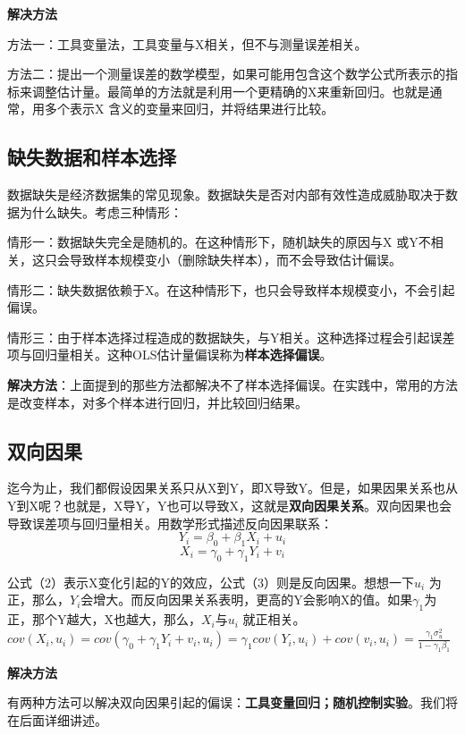 \documentclass[cn,12pt,math=newtx,citestyle=gb7714-2015,bibstyle=gb7714-2015]{elegantbook}
\begin{document}
\textbf{解决方法}

方法一：工具变量法，工具变量与X相关，但不与测量误差相关。

方法二：提出一个测量误差的数学模型，如果可能用包含这个数学公式所表示的指标来调整估计量。最简单的方法就是利用一个更精确的X来重新回归。也就是通常，用多个表示X 含义的变量来回归，并将结果进行比较。

\subsection{缺失数据和样本选择}
数据缺失是经济数据集的常见现象。数据缺失是否对内部有效性造成威胁取决于数据为什么缺失。考虑三种情形：

情形一：数据缺失完全是随机的。在这种情形下，随机缺失的原因与X 或Y不相关，这只会导致样本规模变小（删除缺失样本），而不会导致估计偏误。

情形二：缺失数据依赖于X。在这种情形下，也只会导致样本规模变小，不会引起偏误。

情形三：由于样本选择过程造成的数据缺失，与Y相关。这种选择过程会引起误差项与回归量相关。这种OLS估计量偏误称为\textbf{样本选择偏误}。

\textbf{解决方法}：上面提到的那些方法都解决不了样本选择偏误。在实践中，常用的方法是改变样本，对多个样本进行回归，并比较回归结果。

\subsection{双向因果}
迄今为止，我们都假设因果关系只从X到Y，即X导致Y。但是，如果因果关系也从Y到X呢？也就是，X导Y，Y也可以导致X，这就是\textbf{双向因果关系}。双向因果也会导致误差项与回归量相关。用数学形式描述反向因果联系：
\begin{equation}
	Y_i=\beta_0+\beta_1X_i+u_i
\end{equation}
\begin{equation}
	X_i=\gamma_0+\gamma_1Y_i+v_i
\end{equation}

公式（2）表示X变化引起的Y的效应，公式（3）则是反向因果。想想一下$u_i$ 为正，那么，$Y_i$会增大。而反向因果关系表明，更高的Y会影响X的值。如果$\gamma_1$为正，那个Y越大，X也越大，那么，$X_i$与$u_i$ 就正相关。$cov(X_i,u_i)=cov(\gamma_0+\gamma_1Y_i+v_i,u_i)=\gamma_1{cov(Y_i,u_i)}+cov(v_i,u_i)=\frac{\gamma_1\sigma_u^2}{1-\gamma_1\beta_1}$

\textbf{解决方法}

有两种方法可以解决双向因果引起的偏误：\textbf{工具变量回归；随机控制实验}。我们将在后面详细讲述。
\end{document}
